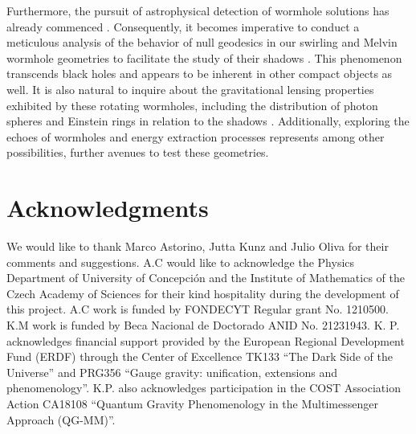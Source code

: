\documentclass[aps,preprint,groupedaddress,nofootinbib,superscriptaddress,showkeys,showpacs,eqsecnum,amsmath,amssymb]{revtex4-1}
\begin{document}
Furthermore, the pursuit of astrophysical detection of wormhole solutions has already commenced \cite{Abe:2010ap,Toki:2011zu,Takahashi:2013jqa}. Consequently, it becomes imperative to conduct a meticulous analysis of the behavior of null geodesics in our swirling and Melvin wormhole geometries to facilitate the study of their shadows \cite{Gyulchev:2018fmd,Shaikh:2018kfv,Perlick:2021aok}. This phenomenon transcends black holes and appears to be inherent in other compact objects as well. It is also natural to inquire about the gravitational lensing properties exhibited by these rotating wormholes, including the distribution of photon spheres and Einstein rings in relation to the shadows \cite{Cramer:1994qj,Safonova:2001vz,Perlick:2003vg,Nandi:2006ds,Kuhfittig:2013hva,Tsukamoto:2016zdu,Shaikh:2018oul,Jusufi:2017mav,Huang:2023yqd}. Additionally, exploring the echoes of wormholes \cite{Mark:2017dnq,Bueno:2017hyj,Liu:2020qia,Vlachos:2021weq,Yang:2022ryf} and energy extraction processes \cite{Patel:2022jbk,Ye:2023xyv}  represents among other possibilities, further avenues to test these geometries.


















\section{Acknowledgments} 

We would like to thank Marco Astorino, Jutta Kunz and Julio Oliva for their comments and suggestions. A.C would like to acknowledge the Physics Department of University of Concepci\'on and the Institute of Mathematics of the Czech Academy of Sciences for their kind hospitality during the development of this project. A.C work is funded by FONDECYT Regular grant No. 1210500. K.M work is funded by Beca Nacional de Doctorado ANID No. 21231943.
K. P. acknowledges financial support
provided by the European Regional Development Fund (ERDF) through the Center of Excellence TK133 “The
Dark Side of the Universe” and PRG356 “Gauge gravity: unification, extensions and phenomenology”. K.P. also
acknowledges participation in the COST Association Action CA18108 “Quantum Gravity Phenomenology in the
Multimessenger Approach (QG-MM)”.
\end{document}

